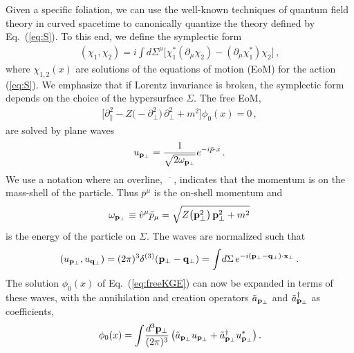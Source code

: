 \documentclass[reprint,superscriptaddress,english,preprintnumbers,amsmath,amssymb,aps,prx]{revtex4-2}
\def\eq#1{(\ref{#1})}
\def\Eq#1{Eq.~(\ref{#1})}
\begin{document}
Given a specific foliation, we can use the well-known techniques of quantum field theory in curved spacetime to canonically quantize the theory defined by \Eq{eq:S}. To this end, we define the symplectic form
\begin{align}\label{eq:symp}
(\chi_1 , \chi_2 )= i \int\!d\Sigma^\mu \big[ \chi_1^* (\partial_\mu \chi_2) - (\partial_\mu \chi_1^*)\chi_2 \big]\,,
\end{align}
where $\chi_{1,2}(x)$ are solutions of the equations of motion (EoM) for the action \eq{eq:S}. We emphasize that if Lorentz invariance is broken, the symplectic form depends on the choice of the hypersurface $\Sigma$. The free EoM,
\begin{align}\label{eq:freeKGE}
\Big[ \partial_\parallel^2 - Z\big(-\partial_\perp^2\big)\, \partial_\perp^2 + m^2  \Big] \phi_0(x) = 0\,,
\end{align}
are solved by plane waves
\begin{align}\label{eq:u}
u_{\bold{p}_\perp} = \frac{1}{\sqrt{2 \omega_{\bold{p}_\perp}}} e^{-i \bar p \cdot x}\,.
\end{align}
We use a notation where an overline, $\,\overline{\phantom{p}}\,$, indicates that the momentum is on the mass-shell of the particle. Thus $\bar p^\mu$ is the on-shell momentum
and 
\begin{align}\label{eq:disp}
\omega_{\bold{p}_\perp} 
\equiv \hat v^\mu \bar p_\mu 
= \sqrt{Z\big(\bold{p}_\perp^2\big)\, \bold{p}_\perp^2 +m^2}
\end{align}
is the energy of the particle on $\Sigma$.
The waves are normalized such that
\begin{align}\label{eq:unorm}
( u_{\bold{p}_\perp}, u_{\bold{q}_\perp} ) = (2\pi)^3 \delta^{(3)}(\bold{p}_\perp - \bold{q}_\perp) = \int\! d\Sigma\, e^{-i (\bold{p}_\perp-\bold{q}_\perp)\cdot \bold{x}_\perp} \,.
\end{align}
The solution $\phi_0(x)$ of \Eq{eq:freeKGE} can now be expanded in terms of these waves, with the annihilation and creation operators $\tilde a_{\bold{p}_\perp}$ and $\tilde a_{\bold{p}_\perp}^\dagger$ as coefficients,
\begin{align}
\phi_0(x) = \int\!\frac{d^3\bold{p}_\perp}{(2\pi)^3}\,\big( \tilde a_{\bold{p}_\perp} u_{\bold{p}_\perp} + \tilde a_{\bold{p}_\perp}^\dagger u_{\bold{p}_\perp}^* \big)\,.
\end{align}
\end{document}
